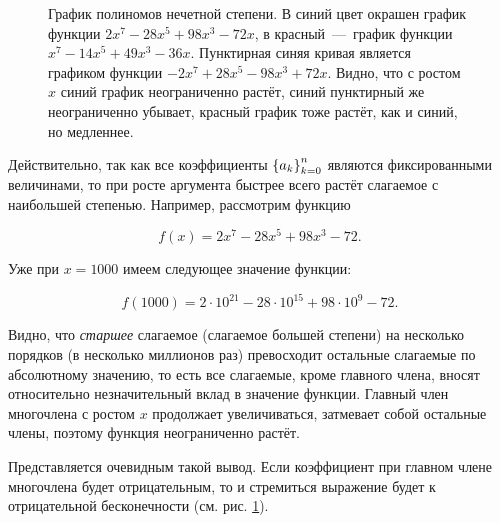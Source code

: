 \documentclass[12pt]{article}
\begin{document}
\begin{figure}[htbp]
  \label{fig:1}
	\centering
	\caption{График полиномов нечетной степени. В синий цвет окрашен график функции $2x^{7} - 28 x^{5} + 98 x^{3} - 72 x$, в красный~\----~график функции $x^{7} - 14 x^{5} + 49 x^{3} - 36 x$. Пунктирная синяя кривая является графиком функции $-2x^{7} + 28 x^{5} -98 x^{3} + 72 x$. Видно, что с ростом $x$ синий график неограниченно растёт, синий пунктирный же неограниченно убывает, красный график тоже растёт, как и синий, но медленнее.}
\end{figure}

\noindent Действительно, так как все коэффициенты $\qty{a_k}_{k=0}^n$ являются фиксированными величинами, то при росте аргумента быстрее всего растёт слагаемое с наибольшей степенью. Например, рассмотрим функцию

\begin{equation}
f(x)=2x^{7} - 28 x^{5} + 98 x^{3} - 72.
\end{equation}

Уже при $x = 1000$ имеем следующее значение функции:

\begin{equation}
f(1000) = 2 \cdot 10^{21} - 28 \cdot 10^{15} + 98 \cdot 10^9 - 72.
\end{equation}

Видно, что \emph{старшее} слагаемое (слагаемое большей степени) на несколько порядков (в несколько миллионов раз) превосходит остальные слагаемые по абсолютному значению, то есть все слагаемые, кроме главного члена, вносят относительно незначительный вклад в значение функции. Главный член многочлена с ростом $x$ продолжает увеличиваться, затмевает собой остальные члены, поэтому функция неограниченно растёт.

\par
Представляется очевидным такой вывод. Если коэффициент при главном члене многочлена будет отрицательным, то и стремиться выражение будет к отрицательной бесконечности (см. рис. \ref{fig:1}).
\end{document}
